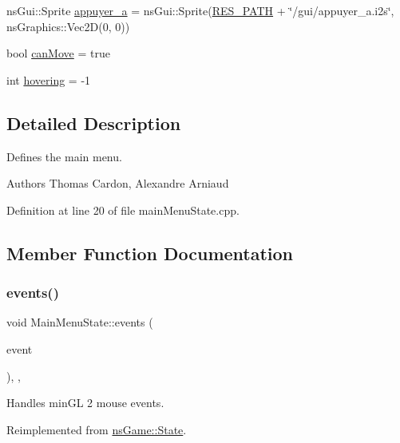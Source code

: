 \begin{DoxyCompactItemize}
\item 
ns\+Gui\+::\+Sprite \hyperlink{class_main_menu_state_ac2034a62c91d9b96ac70d7ed68a6bb0c}{appuyer\+\_\+a} = ns\+Gui\+::\+Sprite(\hyperlink{definitions_8h_a793644bd88146828177a2a4f57e3bf01}{R\+E\+S\+\_\+\+P\+A\+TH} + \char`\"{}/gui/appuyer\+\_\+a.\+i2s\char`\"{}, ns\+Graphics\+::\+Vec2D(0, 0))
\item 
bool \hyperlink{class_main_menu_state_a9db4bda687dbd65f369026e82ab6f5fd}{can\+Move} = true
\item 
int \hyperlink{class_main_menu_state_ae40f9519e207f3f4d6b67f2c4e28dbfd}{hovering} = -\/1
\end{DoxyCompactItemize}


\subsection{Detailed Description}
Defines the main menu. 

\begin{DoxyAuthor}{Authors}
Thomas Cardon, Alexandre Arniaud 
\end{DoxyAuthor}


Definition at line 20 of file main\+Menu\+State.\+cpp.



\subsection{Member Function Documentation}
\mbox{\label{class_main_menu_state_a6d740479d4dce733c069921478d70a37}} 
\subsubsection{\texorpdfstring{events()}{events()}}
{\footnotesize\ttfamily void Main\+Menu\+State\+::events (\begin{DoxyParamCaption}\item[{ns\+Event\+::\+Event\+\_\+t}]{event }\end{DoxyParamCaption})\hspace{0.3cm}{\ttfamily [inline]}, {\ttfamily [override]}, {\ttfamily [virtual]}}



Handles min\+GL 2 mouse events. 



Reimplemented from \hyperlink{structns_game_1_1_state_a2e1daaca20e580bdb4baf8215e1b51c9}{ns\+Game\+::\+State}.



